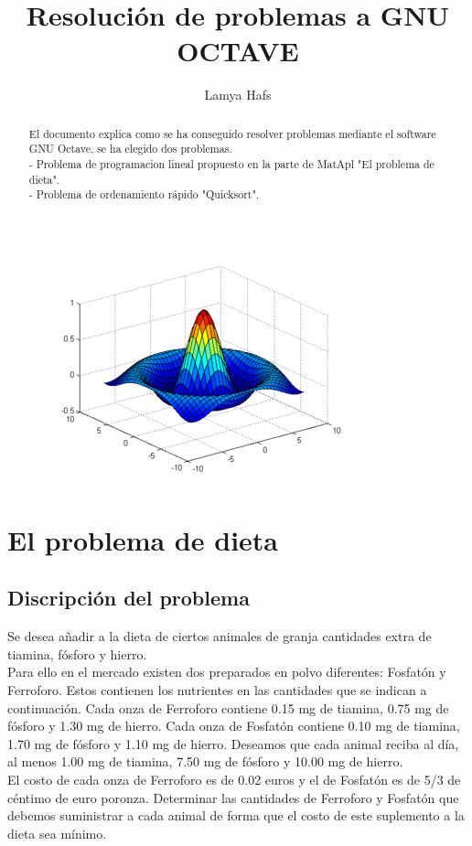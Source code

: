 \documentclass[a4,12pt]{article}
\title{Resolución de problemas a GNU OCTAVE}
\author{Lamya Hafs}
\begin{document}
\maketitle
\bigskip
\bigskip
\bigskip
\begin{figure}[H]
  \centering
    \includegraphics{imagenes/octave}
\end{figure}
\newpage

\maketitle

\begin{abstract}
El documento explica como se ha conseguido resolver problemas mediante el software GNU Octave, se ha elegido dos problemas.\\
- Problema de programacion lineal propuesto en la parte de MatApl "El problema de dieta".\\
- Problema de ordenamiento rápido "Quicksort".\\

\end{abstract}

\tableofcontents
\newpage

\section{El problema de dieta}

\subsection{Discripción del problema}
Se desea añadir a la dieta de ciertos animales de granja cantidades extra de tiamina, fósforo y hierro.\\
Para ello en el mercado existen dos preparados en polvo diferentes: Fosfatón y Ferroforo. Estos
contienen los nutrientes en las cantidades que se indican a continuación. Cada onza de Ferroforo
contiene 0.15 mg de tiamina, 0.75 mg de fósforo y 1.30 mg de hierro. Cada onza de Fosfatón contiene 0.10 mg de tiamina, 1.70 mg de fósforo y 1.10 mg de hierro. Deseamos que cada animal reciba al día, al menos 1.00 mg de tiamina, 7.50 mg de fósforo y 10.00 mg de hierro.\\
El costo de cada onza de Ferroforo es de 0.02 euros y el de Fosfatón es de 5/3 de céntimo de euro poronza. Determinar las cantidades de Ferroforo y Fosfatón que debemos suministrar a cada animal de forma que el costo de este suplemento a la dieta sea mínimo.\\
\end{document}
